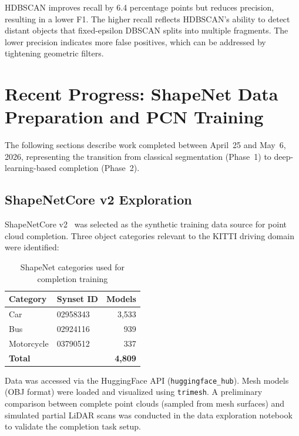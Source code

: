 \documentclass[a4paper, 12pt]{article}
\begin{document}
HDBSCAN improves recall by 6.4 percentage points but reduces precision, resulting in a lower F1. The higher recall reflects HDBSCAN's ability to detect distant objects that fixed-epsilon DBSCAN splits into multiple fragments. The lower precision indicates more false positives, which can be addressed by tightening geometric filters.

\section{Recent Progress: ShapeNet Data Preparation and PCN Training}

\begin{recentwork}
The following sections describe work completed between April~25 and May~6, 2026, representing the transition from classical segmentation (Phase~1) to deep-learning-based completion (Phase~2).
\end{recentwork}

\subsection{ShapeNetCore v2 Exploration}

ShapeNetCore v2~\cite{shapenet2015} was selected as the synthetic training data source for point cloud completion. Three object categories relevant to the KITTI driving domain~\cite{geiger2012cvpr} were identified:

\begin{table}[H]
\centering
\caption{ShapeNet categories used for completion training}
\begin{tabular}{llr}
\toprule
\textbf{Category} & \textbf{Synset ID} & \textbf{Models} \\
\midrule
Car         & 02958343 & 3{,}533 \\
Bus         & 02924116 & 939 \\
Motorcycle  & 03790512 & 337 \\
\midrule
\textbf{Total} & & \textbf{4{,}809} \\
\bottomrule
\end{tabular}
\end{table}

Data was accessed via the HuggingFace API (\texttt{huggingface\_hub}). Mesh models (OBJ format) were loaded and visualized using \texttt{trimesh}. A preliminary comparison between complete point clouds (sampled from mesh surfaces) and simulated partial LiDAR scans was conducted in the data exploration notebook to validate the completion task setup.
\end{document}
